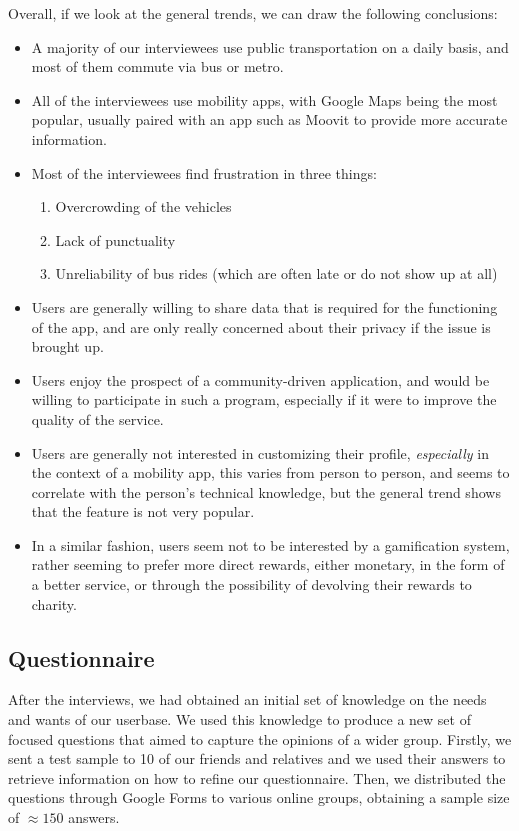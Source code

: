 \documentclass[a4paper, 11pt]{report}
\begin{document}
Overall, if we look at the general trends, we can draw the following conclusions:

\begin{itemize}
	\item A majority of our interviewees use public transportation on a daily basis, and most of
	      them commute via bus or metro.
	\item All of the interviewees use mobility apps, with Google Maps being the most popular,
	      usually paired with an app such as Moovit to provide more accurate information.
	\item Most of the interviewees find frustration in three things:
	      \begin{enumerate}
		      \item Overcrowding of the vehicles
		      \item Lack of punctuality
		      \item Unreliability of bus rides (which are often late or do not show up at all)
	      \end{enumerate}
	\item Users are generally willing to share data that is required for the functioning of the app,
	      and are only really concerned about their privacy if the issue is brought up.
	\item Users enjoy the prospect of a community-driven application, and would be willing to
	      participate in such a program, especially if it were to improve the quality of the service.
	\item Users are generally not interested in customizing their profile, \emph{especially}
	      in the context of a mobility app, this varies from person to person, and seems to correlate
	      with the person's technical knowledge, but the general trend shows that the feature is not
	      very popular.
	\item In a similar fashion, users seem not to be interested by a gamification system, rather
	      seeming to prefer more direct rewards, either monetary, in the form of a better service, or through
	      the possibility of devolving their rewards to charity.
\end{itemize}

\subsection{Questionnaire}\label{ssec:questionnaire}


After the interviews, we had obtained an initial set of knowledge on the needs and wants of
our userbase. We used this knowledge to produce a new set of focused questions that aimed
to capture the opinions of a wider group. Firstly, we sent a test sample to 10 of our friends
and relatives and we used their answers to retrieve information on how to refine our questionnaire.
Then, we distributed the questions through Google Forms to various online groups,
obtaining a sample size of $\approx150$ answers.
\end{document}
